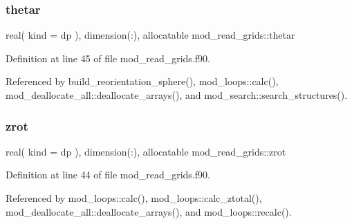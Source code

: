 \mbox{\label{namespacemod__read__grids_a40918dc75ea77a2757ea8d8dd43beb9e}} 
\subsubsection{\texorpdfstring{thetar}{thetar}}
{\footnotesize\ttfamily real( kind = dp ), dimension(\+:), allocatable mod\+\_\+read\+\_\+grids\+::thetar}



Definition at line 45 of file mod\+\_\+read\+\_\+grids.\+f90.



Referenced by build\+\_\+reorientation\+\_\+sphere(), mod\+\_\+loops\+::calc(), mod\+\_\+deallocate\+\_\+all\+::deallocate\+\_\+arrays(), and mod\+\_\+search\+::search\+\_\+structures().

\mbox{\label{namespacemod__read__grids_aa1dc0d4a91ccebc952bde4d1f380b174}} 
\subsubsection{\texorpdfstring{zrot}{zrot}}
{\footnotesize\ttfamily real( kind = dp ), dimension(\+:), allocatable mod\+\_\+read\+\_\+grids\+::zrot}



Definition at line 44 of file mod\+\_\+read\+\_\+grids.\+f90.



Referenced by mod\+\_\+loops\+::calc(), mod\+\_\+loops\+::calc\+\_\+ztotal(), mod\+\_\+deallocate\+\_\+all\+::deallocate\+\_\+arrays(), and mod\+\_\+loops\+::recalc().

